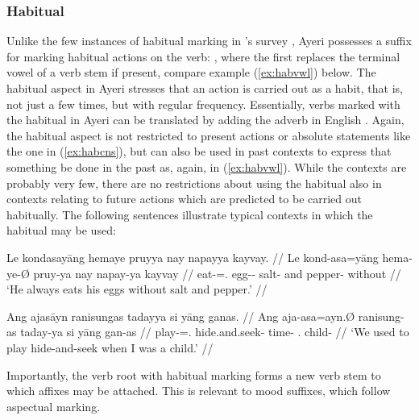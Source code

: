
\subsubsection{Habitual}

Unlike the few instances of habitual marking in \citeauthor{dahl1985}'s survey 
\citep[96]{dahl1985}, Ayeri possesses a suffix for marking habitual actions on 
the verb: , where the first  replaces the terminal vowel 
of a verb stem if present, compare example (\ref{ex:habvwl}) below. The 
habitual aspect in Ayeri stresses that an action is carried out as a habit, that 
is, not just a few times, but with regular frequency. Essentially, verbs marked 
with the habitual in Ayeri can be translated by adding the adverb  
in English \citep[97]{dahl1985}. Again, the habitual aspect is not restricted to 
present actions or absolute statements like the one in (\ref{ex:habcns}), but 
can also be used in past contexts to express that something  be done 
in the past as, again, in (\ref{ex:habvwl}). While the contexts are probably 
very few, there are no restrictions about using the habitual also in contexts 
relating to future actions which are predicted to be carried out habitually. The 
following sentences illustrate typical contexts in which the habitual may be 
used:

\pex
\a\label{ex:habcns}\begingl
	\gla Le kondasayāng hemaye pruyya nay napayya kayvay. //
	\glb Le kond-asa=yāng hema-ye-Ø pruy-ya nay napay-ya kayvay //
	\glc \PatTI{} eat-\Hab{}=\TsgM{}.\Aarg{} egg-\Pl{}-\Top{} salt-\Loc{} 
		and pepper-\Loc{} without //
	\glft `He always eats his eggs without salt and pepper.' //
\endgl

\a\label{ex:habvwl}\begingl
	\gla Ang ajasāyn ranisungas tadayya si yāng ganas. //
	\glb Ang aja-asa=ayn.Ø ranisung-as taday-ya si yāng gan-as //
	\glc \AgtT{} play-\Hab{}=\Fpl{}.\Top{} hide.and.seek-\Parg{} 
		time-\Loc{} \Rel{} \Fsg{}.\Aarg{} child-\Parg{} //
	\glft `We used to play hide-and-seek when I was a child.' //
\endgl

\xe

Importantly, the verb root with habitual marking forms a new verb stem to which 
affixes may be attached. This is relevant to mood suffixes, which follow 
aspectual marking.




